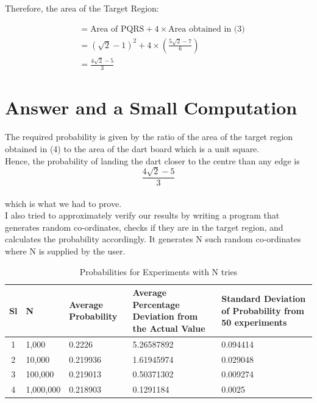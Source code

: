 \documentclass[10pt]{article}
\begin{document}
Therefore, the area of the Target Region:

\begin{equation}
\begin{split}
&= \text{Area of PQRS} + 4 \times \text{Area obtained in (3)}\\
&= {(\sqrt{2} - 1)}^2 + 4 \times \left(\frac{5\sqrt{2} - 7}{6}\right)\\
&= \frac{4\sqrt{2} - 5}{3}
\end{split}
\end{equation}
\newpage
\section{Answer and a Small Computation}
The required probability is given by the ratio of the area of the target region obtained in (4) to the area of the dart board which is a unit square.\\

Hence, the probability of landing the dart closer to the centre than any edge is $$\frac{4\sqrt{2} - 5}{3}$$\\
which is what we had to prove.\\

I also tried to approximately verify our results by writing a program that generates random co-ordinates, checks if they are in the target region, and calculates the probability accordingly. It generates N such random co-ordinates where N is supplied by the user.\\

\begin{table}[H]
  \centering
  {\renewcommand{\arraystretch}{1.5}
  \renewcommand{\tabcolsep}{0.2cm}
  \begin{tabular}{c|p{1.5 cm}|p{2 cm}|p{3 cm}|p{3 cm}}
    Sl & N & Average Probability & Average Percentage Deviation from the Actual Value & Standard Deviation of Probability from 50 experiments\\
    \hline
    1 & 1,000 & 0.2226 & 5.26587892 & 0.094414\\
    2 & 10,000 & 0.219936 & 1.61945974 & 0.029048\\
    3 & 100,000 & 0.219013 & 0.50371302 & 0.009274\\
    4 & 1,000,000 & 0.218903 & 0.1291184 & 0.0025\\
  \end{tabular}}
  \caption{Probabilities for Experiments with N tries}
  \label{}
\end{table}
\end{document}
